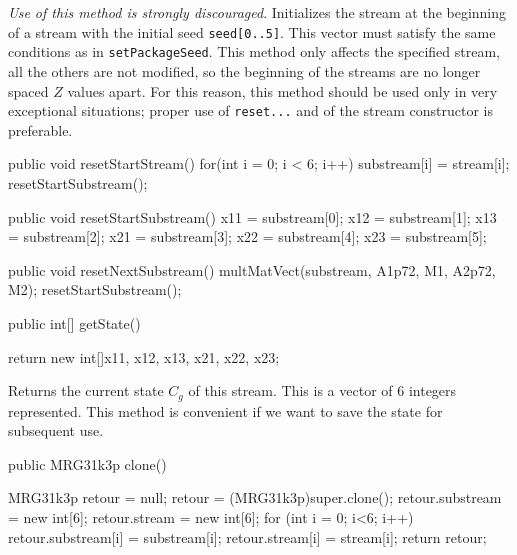 \begin{tabb}  \emph{Use of this method is strongly discouraged}.
  Initializes the stream at the beginning of a stream with the
  initial seed \texttt{seed[0..5]}. This vector must satisfy the same conditions
  as in \texttt{setPackageSeed}.
  This method only affects the specified stream, all the others are not
  modified, so the beginning of the streams are no longer spaced $Z$ values
  apart.
  For this reason, this method should be used only in very
  exceptional situations; proper use of \texttt{reset...}
  and of the stream constructor is preferable.
\end{tabb}
\begin{htmlonly}
\end{htmlonly}
\begin{code}
  \begin{hide}

   public void resetStartStream() {
      for(int i = 0; i < 6; i++)
         substream[i] = stream[i];
      resetStartSubstream();
   }

   public void resetStartSubstream() {
      x11 = substream[0];
      x12 = substream[1];
      x13 = substream[2];
      x21 = substream[3];
      x22 = substream[4];
      x23 = substream[5];
   }

   public void resetNextSubstream() {
      multMatVect(substream, A1p72, M1, A2p72, M2);
      resetStartSubstream();
   }

\end{hide}
   public int[] getState() \begin{hide} {
      return new int[]{x11, x12, x13, x21, x22, x23};
   } \end{hide}
\end{code}
 \begin{tabb} Returns the current state $C_g$ of this stream.
  This is a vector of 6 integers represented.
  This method is convenient if we want to save the state for
  subsequent use.
 \end{tabb}
\begin{htmlonly}
\end{htmlonly}
\begin{code}

   public MRG31k3p clone() \begin{hide} {
      MRG31k3p retour = null;
      retour = (MRG31k3p)super.clone();
      retour.substream = new int[6];
      retour.stream = new int[6];
      for (int i = 0; i<6; i++) {
         retour.substream[i] = substream[i];
         retour.stream[i] = stream[i];
      }
      return retour;
   }\end{hide}
\end{code}
